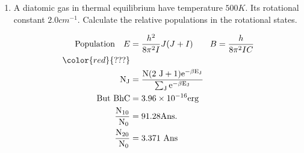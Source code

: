 \begin{enumerate}
	\item A diatomic gas in thermal equilibrium have temperature $500K$. Its rotational constant $2.0 cm^{-1}$. Calculate the relative populations in the rotational states.
	\begin{answer}
		\begin{align*}
		\text{Population}\quad E&=\frac{h^2}{8\pi^2 I}J(J+I)\qquad B=\frac{h}{8\pi^2IC}\\
		\color{red}{???}\\
		\mathrm{N}_{\mathrm{J}}&=\frac{\mathrm{N}(2 \mathrm{~J}+1) \mathrm{e}^{-\beta \mathrm{E}_{\mathrm{J}}}}{\sum_{\mathrm{J}} \mathrm{e}^{-\beta \mathrm{E}_{\mathrm{J}}}}\\
	\text{	But }
		\mathrm{BhC}&=3.96 \times 10^{-16} \mathrm{erg}\\
		\frac{\mathrm{N}_{10}}{\mathrm{~N}_{0}}&=91.28 \text{Ans.}\\
		\frac{\mathrm{N}_{20}}{\mathrm{~N}_{0}}&=3.371\text{ Ans}
		\end{align*}
	\end{answer}
	
	
	
	
	
	
	
\end{enumerate}